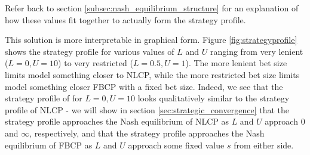 \documentclass[../../main/main.tex]{subfiles}
\begin{document}
Refer back to section \ref{subsec:nash_equilibrium_structure} for an explanation of how these values fit together to actually form the strategy profile.

This solution is more interpretable in graphical form. Figure \ref{fig:strategyprofile} shows the strategy profile for various values of $L$ and $U$ ranging from very lenient ($L=0, U=10$) to very restricted ($L=0.5, U=1$). The more lenient bet size limits model something closer to NLCP, while the more restricted bet size limits model something closer FBCP with a fixed bet size. Indeed, we see that the strategy profile of for $L=0, U=10$ looks qualitatively similar to the strategy profile of NLCP - we will show in section \ref{sec:strategic_convergence} that the strategy profile approaches the Nash equilibrium of NLCP as $L$ and $U$ approach $0$ and $\infty$, respectively, and that the strategy profile approaches the Nash equilibrium of FBCP as $L$ and $U$ approach some fixed value $s$ from either side.
\end{document}
